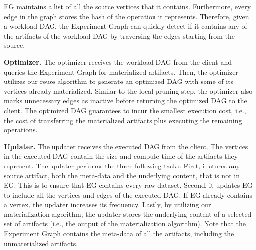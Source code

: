 EG maintains a list of all the source vertices that it contains.
Furthermore, every edge in the graph stores the hash of the operation it represents.
Therefore, given a workload DAG, the Experiment Graph can quickly detect if it contains any of the artifacts of the workload DAG by traversing the edges starting from the source.

\textbf{Optimizer. }
The optimizer receives the workload DAG from the client and queries the Experiment Graph for materialized artifacts.
Then, the optimizer utilizes our reuse algorithm to generate an optimized DAG with some of its vertices already materialized.
Similar to the local pruning step, the optimizer also marks unnecessary edges as inactive before returning the optimized DAG to the client.
The optimized DAG guarantees to incur the smallest execution cost, i.e., the cost of transferring the materialized artifacts plus executing the remaining operations.

\textbf{Updater.}
The updater receives the executed DAG from the client.
The vertices in the executed DAG contain the size and compute-time of the artifacts they represent.
The updater performs the three following tasks.
First, it stores any source artifact, both the meta-data and the underlying content, that is not in EG.
This is to ensure that EG contains every raw dataset.
Second, it updates EG to include all the vertices and edges of the executed DAG.
If EG already contains a vertex, the updater increases its frequency.
Lastly, by utilizing our materialization algorithm, the updater stores the underlying content of a selected set of artifacts (i.e., the output of the materialization algorithm).
Note that the Experiment Graph contains the meta-data of all the artifacts, including the unmaterialized artifacts.


